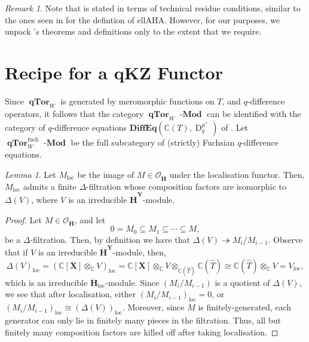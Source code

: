 \documentclass[a4paper]{report}
\theoremstyle{theorem}
\theoremstyle{definition}
\theoremstyle{remark}
\newtheorem{remark}{Remark}
\theoremstyle{proposition}
\theoremstyle{conjecture}
\theoremstyle{lemma}
\newtheorem{lemma}{Lemma}
\theoremstyle{corollary}
\theoremstyle{exercise}
\theoremstyle{example}
\newcommand{\C}{\mathbb{C}}
\newcommand{\mcal}{\mathcal}
\newcommand{\on}{\operatorname}
\newcommand{\lmod}{\on{\mathbf{-Mod}}}
\newcommand{\qTor}{\on{\mathbf{qTor}}}
\begin{document}
  \begin{remark}
      Note that \cite[Theorem 7.2]{beg00} is stated in terms of technical residue
      conditions, similar to the ones seen in \cite{gkv95} for the defintion of 
      ellAHA. However, for our purposes, we unpack \cite{beg00}'s theorems and 
      definitions only to the extent that we require.
  \end{remark}
  
  \section{Recipe for a qKZ Functor}
  
  Since $\qTor_W$ is generated 
  by meromorphic functions on $T$, and $q$-difference operators, it follows
  that the category $\qTor_W\lmod$ can be identified with the category of 
  $q$-difference equations $\mathbf{DiffEq}(\C(T), \on{D}^{\mu^\vee}_q)$
  of \cite{sauloy03}. Let $\qTor_W^{\on{fuch}}\lmod$ be the full subcategory
  of (strictly) Fuchsian $q$-difference equations.
  
  \begin{lemma}\label{lem_finite_filt}
      Let $M_{\on{loc}}$ be the image of $M \in \mcal{O}_{\mathbf{\ddot{\mathbf{H}}}}$ under the localisation 
      functor. 
      Then, $M_{\on{loc}}$ admits a finite $\Delta$-filtration whose composition factors are 
      isomorphic to $\Delta(V)$, where $V$ is an irreducible 
      $\mathbf{\dot{H}}^{\mathbf{Y}}$-module.
  \end{lemma}
  
  \begin{proof}
      Let $M \in \mcal{O}_{\mathbf{\ddot{\mathbf{H}}}}$, and let 
      $$0 = M_0 \subseteq M_1 \subseteq \cdots \subseteq M,$$
      be a $\Delta$-filtration. Then, by definition we have that
      $\Delta(V) \twoheadrightarrow M_i/M_{i-1}$. 
      Observe that if $V$ is an irreducible $\mathbf{\ddot{\mathbf{H}}}^{\mathbf{Y}}$-module,
      then, $$\Delta(V)_{\on{loc}} = (\C[\mathbf{X}] \otimes_\C V)_{\on{loc}} = \C[\mathbf{X}]\otimes_\C V \otimes_{\C(\widehat{T})} \C(\widehat{T}) \cong \C(\widehat{T}) \otimes_\C V = V_{\on{loc}},$$
      which is an irreducible $\ddot{\mathbf{H}}_{\on{loc}}$-module.
      Since $(M_i/M_{i-1})$ is a quotient of $\Delta(V)$, we see that after 
      localisation, either $(M_i/M_{i-1})_{\on{loc}} = 0$, or 
      $(M_i/M_{i-1})_{\on{loc}} \cong (\Delta(V))_{\on{loc}}$. 
      Moreover, since $M$ is finitely-generated, each generator can only lie 
      in finitely many pieces in the filtration. Thus, all but finitely many composition factors are killed 
      off after taking localisation.
  \end{proof}
  
\end{document}
